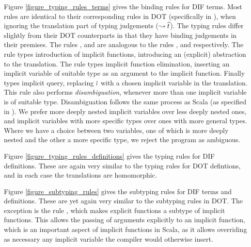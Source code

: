 Figure \ref{figure_typing_rules_terms} gives the binding rules for DIF terms.
Most rules are identical to their corresponding rules in DOT (specifically in
\cite{AGORS16}), when ignoring the translation part of typing judgements
($\leadsto \widehat{t}$). The typing rules differ slightly from their DOT
counterparts in that they have binding judgements in their premises. The rules
,  and  are analogous to the rules
,  and  respectively. The rule
 types introduction of implicit functions, introducing an
(explicit) abstraction to the translation. The rule  types
implicit function elimination, inserting an implicit variable of suitable type
as an argument to the implicit function. Finally  types implicit
query, replacing $\wr$ with a chosen implicit variable in the translation.
This rule also performs \emph{disambiguation}, whenever more than one implicit
variable is of suitable type. Disambiguation follows the same process as Scala
(as specified in \cite{OBLB18}). We prefer more deeply nested implicit
variables over less deeply nested ones, and implicit variables with more
specific types over ones with more general types. Where we have a choice
between two variables, one of which is more deeply nested and the other a more
specific type, we reject the program as ambiguous.

\begin{figure*}[h]
    
    \caption{Typing and translation rules for DIF terms}
    \label{figure_typing_rules_terms}
\end{figure*}

Figure \ref{figure_typing_rules_definitions} gives the typing rules for DIF
definitions. These are again very similar to the typing rules for DOT
defintions, and in each case the translations are homomorphic.

\begin{figure*}[h]
    
    \caption{Typing and translation rules for DIF definitions}
    \label{figure_typing_rules_definitions}
\end{figure*}

Figure \ref{figure_subtyping_rules} gives the subtyping rules for DIF terms and
definitions. These are yet again very similar to the subtyping rules in DOT.
The exception is the rule , which makes explicit functions
a subtype of implicit functions. This allows the passing of arguments
explicitly to an implicit function, which is an important aspect of implicit
functions in Scala, as it allows overriding as necessary any implicit variable
the compiler would otherwise insert.

\begin{figure*}[h]
    
    \caption{Subtyping rules for DIF}
    \label{figure_subtyping_rules}
\end{figure*}
